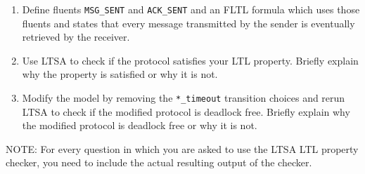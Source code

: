 \documentclass{article}
\begin{document}
\begin{enumerate}
\begin{enumerate}
\item Define fluents \verb"MSG_SENT" and \verb"ACK_SENT" and an FLTL
formula which uses those fluents and states that every message
transmitted by the sender is eventually retrieved by the receiver.

\item Use LTSA to check if the protocol satisfies your LTL property. Briefly explain why the property is satisfied or why it is not.

\item Modify the model by removing the \verb"*_timeout" transition
choices and rerun LTSA to check if the modified protocol is deadlock
free. Briefly explain why the modified protocol is deadlock free or why it is not.
\end{enumerate}
NOTE: For every question in which you are asked to use the LTSA LTL
property checker, you need to include the actual resulting output of
the checker.

\end{enumerate}
\end{document}
